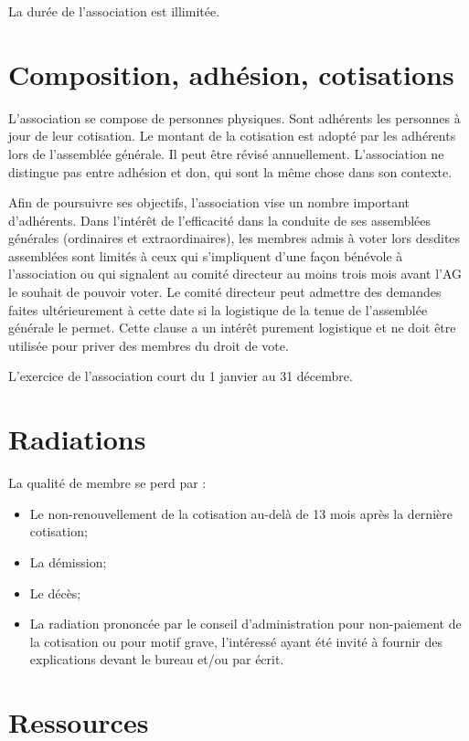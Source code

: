 \documentclass[11 pt]{article}
\begin{document}
La durée de l’association est illimitée.

\section{Composition, adhésion, cotisations}

L’association se compose de personnes physiques. Sont adhérents les
personnes à jour de leur cotisation.  Le montant de la cotisation est
adopté par les adhérents lors de l’assemblée générale. Il peut être
révisé annuellement.  L’association ne distingue pas entre adhésion et
don, qui sont la même chose dans son contexte.

Afin de poursuivre ses objectifs, l’association vise un nombre
important d’adhérents.  Dans l’intérêt de l’efficacité dans la conduite
de ses assemblées générales (ordinaires et extraordinaires), les membres
admis à voter lors desdites assemblées sont limités à ceux qui s’impliquent
d’une façon bénévole à l’association ou qui signalent au comité
directeur au moins trois mois avant l’AG le souhait de pouvoir voter.
Le comité directeur peut admettre des demandes faites ultérieurement à
cette date si la logistique de la tenue de l’assemblée générale le
permet.  Cette clause a un intérêt purement logistique et ne doit être
utilisée pour priver des membres du droit de vote.

L’exercice de l’association court du 1\ier{} janvier au 31 décembre.

\section{Radiations}

La qualité de membre se perd par :

\begin{itemize}
\item Le non-renouvellement de la cotisation au-delà de 13 mois après la dernière cotisation;
\item La démission;
\item Le décès;
\item La radiation prononcée par le conseil d’administration pour
  non-paiement de la cotisation ou pour motif grave, l’intéressé ayant
  été invité à fournir des explications devant le bureau et/ou par
  écrit.
\end{itemize}


\section{Ressources}
\end{document}
